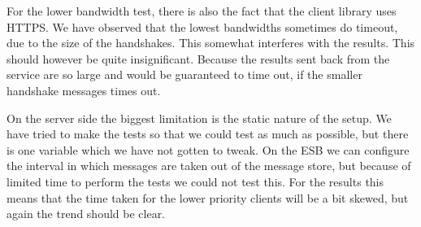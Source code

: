 	For the lower bandwidth test, there is also the fact that the client library uses HTTPS. We have observed that the lowest bandwidths sometimes do timeout, due to the size of the handshakes. This somewhat interferes with the results. This should however be quite insignificant. Because the results sent back from the service are so large and would be guaranteed to time out, if the smaller handshake messages times out.
	
	On the server side the biggest limitation is the static nature of the setup. We have tried to make the tests so that we could test as much as possible, but there is one variable which we have not gotten to tweak. On the ESB we can configure the interval in which messages are taken out of the message store, but because of limited time to perform the tests we could not test this. For the results this means that the time taken for the lower priority clients will be a bit skewed, but again the trend should be clear.
